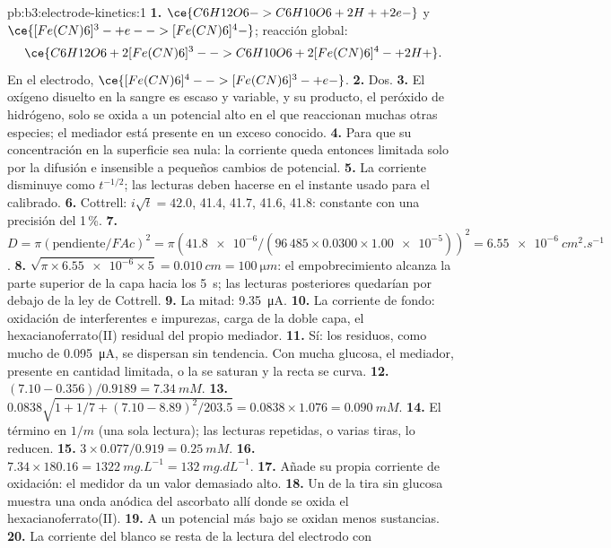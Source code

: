 \begin{solution}{pb:b3:electrode-kinetics:1}
\textbf{1.} $\ce{C6H12O6 -> C6H10O6 + 2 H+ + 2 e-}$ y $\ce{[Fe(CN)6]^3- + e- -> [Fe(CN)6]^4-}$;
reacción global:
\[
  \ce{C6H12O6 + 2 [Fe(CN)6]^3- -> C6H10O6 + 2 [Fe(CN)6]^4- + 2 H+} .
\]
En el electrodo, $\ce{[Fe(CN)6]^4- -> [Fe(CN)6]^3- + e-}$.
\textbf{2.} Dos.
\textbf{3.} El oxígeno disuelto en la sangre es escaso y variable, y su producto, el
peróxido de hidrógeno, solo se oxida a un potencial alto en el que reaccionan muchas otras
especies; el mediador está presente en un exceso conocido.
\textbf{4.} Para que su concentración en la superficie sea nula: la corriente queda entonces limitada
solo por la difusión e insensible a pequeños cambios de potencial.
\textbf{5.} La corriente disminuye como $t^{-1/2}$; las lecturas deben hacerse en el instante usado para el
calibrado.
\textbf{6.} Cottrell: $i\sqrt t = 42.0$, 41.4, 41.7, 41.6, 41.8: constante con una precisión del 1\,\%.
\textbf{7.} $D = \pi(\text{pendiente}/FAc)^2 = \pi(\num{41.8e-6}/(96\,485 \times 0.0300 \times \num{1.00e-5}))^2 = \qty{6.55e-6}{cm^2.s^{-1}}$.
\textbf{8.} $\sqrt{\pi \times \num{6.55e-6} \times 5} = \qty{0.010}{cm} = \qty{100}{\micro m}$: el empobrecimiento alcanza la parte superior de
la capa hacia los \qty{5}{s}; las lecturas posteriores quedarían por debajo de la ley de Cottrell.
\textbf{9.} La mitad: \qty{9.35}{\micro A}.
\textbf{10.} La corriente de fondo: oxidación de interferentes e impurezas,
carga de la doble capa, el hexacianoferrato(II) residual del propio mediador.
\textbf{11.} Sí: los residuos, como mucho de \qty{0.095}{\micro A}, se dispersan sin tendencia. Con mucha glucosa, el mediador, presente en
cantidad limitada, o la  se saturan y la recta se curva.
\textbf{12.} $(7.10 - 0.356)/0.9189 = \qty{7.34}{mM}$.
\textbf{13.} $0.0838\sqrt{1 + 1/7 + (7.10 - 8.89)^2/203.5} = 0.0838 \times 1.076 = \qty{0.090}{mM}$.
\textbf{14.} El término en $1/m$ (una sola lectura); las lecturas repetidas, o varias tiras,
lo reducen.
\textbf{15.} $3 \times 0.077/0.919 = \qty{0.25}{mM}$.
\textbf{16.} $7.34 \times 180.16 = \qty{1322}{mg.L^{-1}} = \qty{132}{mg.dL^{-1}}$.
\textbf{17.} Añade su propia corriente de oxidación: el medidor da un valor demasiado alto.
\textbf{18.} Un  de la tira sin glucosa muestra una onda anódica del
ascorbato allí donde se oxida el hexacianoferrato(II).
\textbf{19.} A un potencial más bajo se oxidan menos sustancias.
\textbf{20.} La corriente del blanco se resta de la lectura del electrodo con 

\end{solution}
